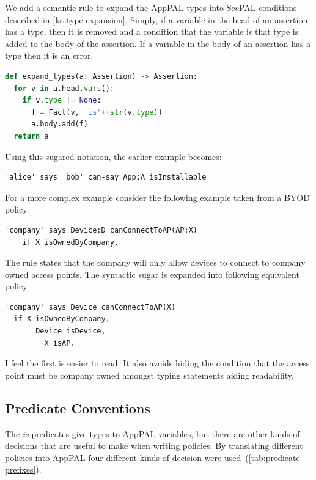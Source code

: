 \documentclass[thesis.tex]{subfiles}
\begin{document}
We add a semantic rule to expand the AppPAL types into SecPAL conditions described in \autoref{lst:type-expansion}.
Simply, if a variable in the head of an assertion has a type, then it is removed and a condition that the variable is that type is added to the body of the assertion. 
If a variable in the body of an assertion has a type then it is an error.

\begin{lstlisting}[language=Python, float, caption={Procedure used to expand types from AppPAL into SecPAL.}, label={lst:type-expansion}]
def expand_types(a: Assertion) -> Assertion:
  for v in a.head.vars():
    if v.type != None:
      f = Fact(v, 'is'++str(v.type))
      a.body.add(f)
  return a
\end{lstlisting}

Using this sugared notation, the earlier example becomes:
\begin{lstlisting}
'alice' says 'bob' can-say App:A isInstallable
\end{lstlisting}

For a more complex example consider the following example taken from a BYOD policy.
\begin{lstlisting}
'company' says Device:D canConnectToAP(AP:X) 
	if X isOwnedByCompany.
\end{lstlisting}
The rule states that the company will only allow devices to connect to company owned access points.
The syntactic sugar is expanded into following equivalent policy.
\begin{lstlisting}
'company' says Device canConnectToAP(X) 
  if X isOwnedByCompany,
	   Device isDevice,
		 X isAP.
\end{lstlisting}
I feel the first is easier to read.
It also avoids hiding the condition that the access point must be company owned amongst typing statements aiding readability.


\subsection{Predicate Conventions}
\label{ssec:types}

The \emph{is} predicates give types to AppPAL variables, but there are other kinds of decisions that are useful to make when writing policies.
By translating different policies into AppPAL four different kinds of decision were used~(\autoref{tab:predicate-prefixes}).
\end{document}
